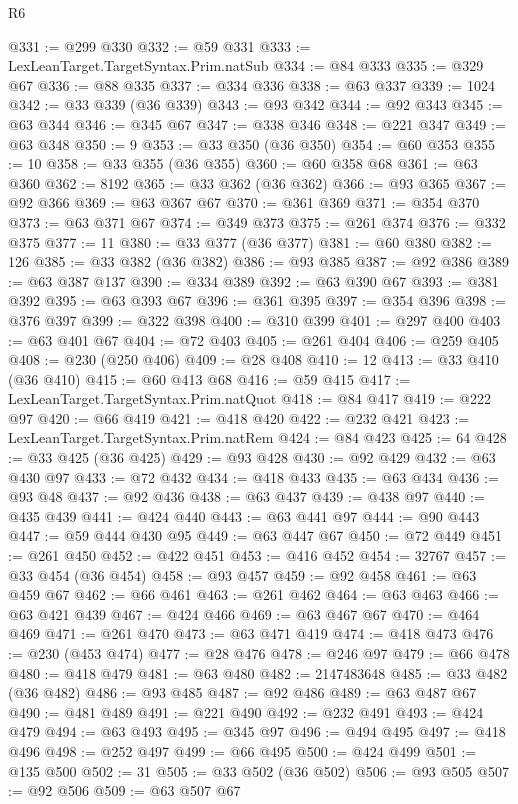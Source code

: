 \begin{lexlean}{R6}
\begin{coremodule}
@331 := @299 @330
@332 := @59 @331
@333 := LexLeanTarget.TargetSyntax.Prim.natSub
@334 := @84 @333
@335 := @329 @67
@336 := @88 @335
@337 := @334 @336
@338 := @63 @337
@339 := 1024
@342 := @33 @339 (@36 @339)
@343 := @93 @342
@344 := @92 @343
@345 := @63 @344
@346 := @345 @67
@347 := @338 @346
@348 := @221 @347
@349 := @63 @348
@350 := 9
@353 := @33 @350 (@36 @350)
@354 := @60 @353
@355 := 10
@358 := @33 @355 (@36 @355)
@360 := @60 @358 @68
@361 := @63 @360
@362 := 8192
@365 := @33 @362 (@36 @362)
@366 := @93 @365
@367 := @92 @366
@369 := @63 @367 @67
@370 := @361 @369
@371 := @354 @370
@373 := @63 @371 @67
@374 := @349 @373
@375 := @261 @374
@376 := @332 @375
@377 := 11
@380 := @33 @377 (@36 @377)
@381 := @60 @380
@382 := 126
@385 := @33 @382 (@36 @382)
@386 := @93 @385
@387 := @92 @386
@389 := @63 @387 @137
@390 := @334 @389
@392 := @63 @390 @67
@393 := @381 @392
@395 := @63 @393 @67
@396 := @361 @395
@397 := @354 @396
@398 := @376 @397
@399 := @322 @398
@400 := @310 @399
@401 := @297 @400
@403 := @63 @401 @67
@404 := @72 @403
@405 := @261 @404
@406 := @259 @405
@408 := @230 (@250 @406)
@409 := @28 @408
@410 := 12
@413 := @33 @410 (@36 @410)
@415 := @60 @413 @68
@416 := @59 @415
@417 := LexLeanTarget.TargetSyntax.Prim.natQuot
@418 := @84 @417
@419 := @222 @97
@420 := @66 @419
@421 := @418 @420
@422 := @232 @421
@423 := LexLeanTarget.TargetSyntax.Prim.natRem
@424 := @84 @423
@425 := 64
@428 := @33 @425 (@36 @425)
@429 := @93 @428
@430 := @92 @429
@432 := @63 @430 @97
@433 := @72 @432
@434 := @418 @433
@435 := @63 @434
@436 := @93 @48
@437 := @92 @436
@438 := @63 @437
@439 := @438 @97
@440 := @435 @439
@441 := @424 @440
@443 := @63 @441 @97
@444 := @90 @443
@447 := @59 @444 @430 @95
@449 := @63 @447 @67
@450 := @72 @449
@451 := @261 @450
@452 := @422 @451
@453 := @416 @452
@454 := 32767
@457 := @33 @454 (@36 @454)
@458 := @93 @457
@459 := @92 @458
@461 := @63 @459 @67
@462 := @66 @461
@463 := @261 @462
@464 := @63 @463
@466 := @63 @421 @439
@467 := @424 @466
@469 := @63 @467 @67
@470 := @464 @469
@471 := @261 @470
@473 := @63 @471 @419
@474 := @418 @473
@476 := @230 (@453 @474)
@477 := @28 @476
@478 := @246 @97
@479 := @66 @478
@480 := @418 @479
@481 := @63 @480
@482 := 2147483648
@485 := @33 @482 (@36 @482)
@486 := @93 @485
@487 := @92 @486
@489 := @63 @487 @67
@490 := @481 @489
@491 := @221 @490
@492 := @232 @491
@493 := @424 @479
@494 := @63 @493
@495 := @345 @97
@496 := @494 @495
@497 := @418 @496
@498 := @252 @497
@499 := @66 @495
@500 := @424 @499
@501 := @135 @500
@502 := 31
@505 := @33 @502 (@36 @502)
@506 := @93 @505
@507 := @92 @506
@509 := @63 @507 @67

\end{coremodule}
\end{lexlean}
